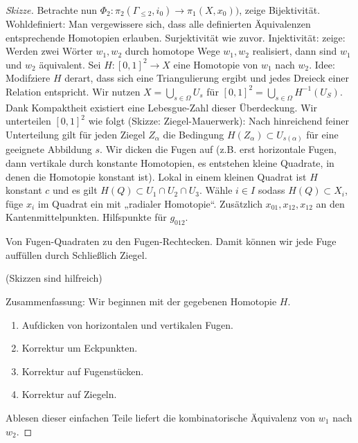 \begin{st}
\begin{proof}[Skizze]
        Betrachte nun $\Phi_2: \pi_2(\Gamma_{\le 2}, i_0) \to \pi_1(X, x_0))$, zeige Bijektivität.
        Wohldefiniert: Man vergewissere sich, dass alle definierten Äquivalenzen entsprechende Homotopien erlauben.
        Surjektivität wie zuvor.
        Injektivität: zeige: Werden zwei Wörter $w_1, w_2$ durch homotope Wege $w_1, w_2$ realisiert, dann sind $w_1$ und $w_2$ äquivalent.
        Sei $H: [0,1]^2 \to X$ eine Homotopie von $w_1$ nach $w_2$.
        Idee: Modifziere $H$ derart, dass sich eine Triangulierung ergibt und jedes Dreieck einer Relation entspricht.
        Wir nutzen $X = \bigcup_{s \in \Omega} U_s$ für $[0,1]^2 = \bigcup_{s \in \Omega} H^{-1}(U_S)$.
        Dank Kompaktheit existiert eine Lebesgue-Zahl dieser Überdeckung.
        Wir unterteilen $[0,1]^2$ wie folgt (Skizze: Ziegel-Mauerwerk):
        Nach hinreichend feiner Unterteilung gilt für jeden Ziegel $Z_\alpha$ die Bedingung $H(Z_\alpha) \subset U_{s(\alpha)}$ für eine geeignete Abbildung $s$.
        Wir dicken die Fugen auf (z.B. erst horizontale Fugen, dann vertikale durch konstante Homotopien, es entstehen kleine Quadrate, in denen die Homotopie konstant ist).
        Lokal in einem kleinen Quadrat ist $H$ konstant $c$ und es gilt $H(Q) \subset U_1 \cap U_2 \cap U_3$.
        Wähle $i \in I$ sodass $H(Q) \subset X_i$, füge $x_i$ im Quadrat ein mit „radialer Homotopie“.
        Zusätzlich $x_{01}, x_{12}, x_{12}$ an den Kantenmittelpunkten.
        Hilfspunkte für $g_{012}$.

        Von Fugen-Quadraten zu den Fugen-Rechtecken.
        Damit können wir jede Fuge auffüllen durch
        Schließlich Ziegel.

        (Skizzen sind hilfreich)

        Zusammenfassung:
        Wir beginnen mit der gegebenen Homotopie $H$.
        \begin{enumerate}[1.]
            \item
                Aufdicken von horizontalen und vertikalen Fugen.
            \item
                Korrektur um Eckpunkten.
            \item
                Korrektur auf Fugenstücken.
            \item
                Korrektur auf Ziegeln.
        \end{enumerate}
        Ablesen dieser einfachen Teile liefert die kombinatorische Äquivalenz von $w_1$ nach $w_2$.
    \end{proof}
\end{st}


